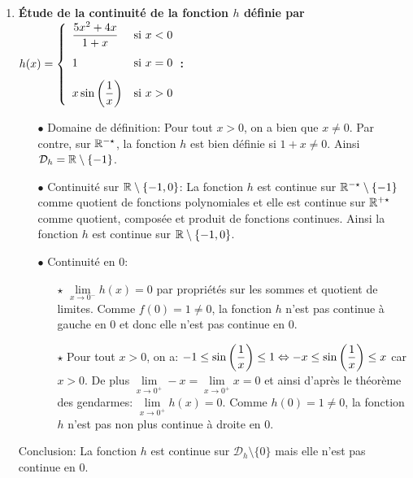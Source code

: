\documentclass[a4paper, 11pt,reqno]{article}
\begin{document}
\begin{correction}
\begin{enumerate}
\begin{itemize}
\begin{itemize}
				            \item[$\star$] D'apr\`{e}s les \'equivalents usuels et par quotient d'\'equivalents, on a: $\ddp\frac{e^x-1}{x}\underset{0}{\thicksim}1$ et ainsi $\lim\limits_{x\to 0^+} g(x)=1=g(0)$. Donc la fonction $g$ est continue \`{a} droite en 0.
			            \end{itemize}
		      \end{itemize}
		      Conclusion: La fonction $g$ est continue sur $\R^{\star}$ et \`{a} droite en 0 mais elle n'est pas continue en 0.
		\item \textbf{\'Etude de la continuit\'e de la fonction $h$ d\'efinie par $h(x)=\left\lbrace \begin{array}{ll} \ddp\frac{5x^2+4x}{1+x}  & \hbox{si}\ x< 0\vsec\\ 1 &\hbox{si}\ x=0\vsec\\ x\sin{\left( \ddp\frac{1}{x} \right)}& \hbox{si}\ x>0  \end{array}\right.$:}
		      \begin{itemize}
			      \item[$\bullet$] Domaine de d\'efinition: Pour tout $x>0$, on a bien que $x\not= 0$. Par contre, sur $\mathbb{R}^{-\star}$, la fonction $h$ est bien d\'efinie si $1+x\not= 0$. Ainsi $\mathcal{D}_h=\mathbb{R}\setminus\lbrace -1\rbrace$.
			      \item[$\bullet$] Continuit\'e sur $\mathbb{R}\setminus\lbrace -1,0\rbrace$: La fonction $h$ est continue sur $\mathbb{R}^{-\star}\setminus\lbrace -1\rbrace$ comme quotient de fonctions polynomiales et elle est continue sur $\mathbb{R}^{+\star}$ comme quotient, compos\'ee et produit de fonctions continues. Ainsi la fonction $h$ est continue sur $\mathbb{R}\setminus\lbrace -1,0\rbrace$.
			      \item[$\bullet$] Continuit\'e en 0:
			            \begin{itemize}
				            \item[$\star$] $\lim\limits_{x\to 0^-} h(x)=0$ par propri\'et\'es sur les sommes et quotient de limites. Comme $f(0)=1\not= 0$, la fonction $h$ n'est pas continue \`{a} gauche en 0 et donc elle n'est pas continue en 0.
				            \item[$\star$] Pour tout $x>0$, on a: $-1\leq \sin{\left( \displaystyle\frac{1}{x} \right)} \leq 1\Leftrightarrow -x\leq \sin{\left( \displaystyle\frac{1}{x} \right)} \leq x$ car $x>0$. De plus $\lim\limits_{x\to 0^+} -x=\lim\limits_{x\to 0^+} x=0$ et ainsi d'apr\`{e}s le th\'eor\`{e}me des gendarmes: $\lim\limits_{x\to 0^+} h(x)=0$. Comme $h(0)=1\not= 0$, la fonction $h$ n'est pas non plus continue \`{a} droite en 0.
			            \end{itemize}
		      \end{itemize}
		      Conclusion: La fonction $h$ est continue sur $\mathcal{D}_h\setminus \lbrace 0\rbrace$ mais elle n'est pas continue en 0.
	\end{enumerate}
\end{correction}
\end{document}
